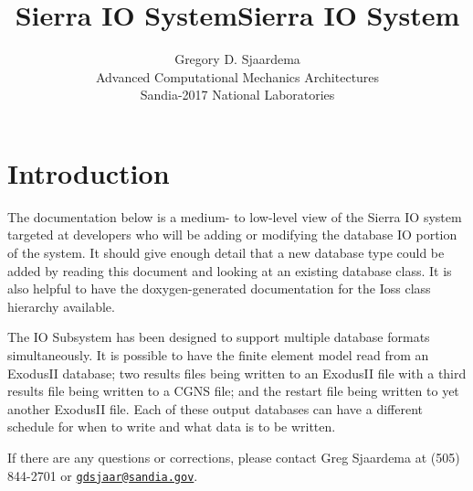 \documentclass[11pt,twoside]{article}
\title{Sierra IO System}
\begin{document}
\clearpage\pagestyle{Standard}
\title{Sierra IO System}
\author{Gregory D. Sjaardema\\
	Advanced Computational Mechanics Architectures\\
	Sandia-2017 National Laboratories}

\maketitle

\setcounter{tocdepth}{3}
\setlength{\parskip}{0ex plus 0.5ex minus 0.2ex}
\tableofcontents

\section{Introduction}
The documentation below is a medium{}- to low{}-level view of the Sierra
IO system targeted at developers who will be adding or modifying the
database IO portion of the system. It should give enough detail that a
new database type could be added by reading this document and looking
at an existing database class. It is also helpful to have the
doxygen{}-generated documentation for the Ioss class hierarchy
available.

The IO Subsystem has been designed to support multiple database formats
simultaneously. It is possible to have the finite element model read
from an ExodusII database; two results files being written to an
ExodusII file with a third results file being written to a CGNS file;
and the restart file being written to yet another ExodusII file. Each of
these output databases can have a different schedule for when to write
and what data is to be written.

If there are any questions or corrections, please contact Greg Sjaardema
at (505) 844{}-2701 or \href{mailto:gdsjaar@sandia.gov}{\nolinkurl{gdsjaar@sandia.gov}}.

\setlength{\parskip}{1ex plus 0.5ex minus 0.2ex}
\end{document}

